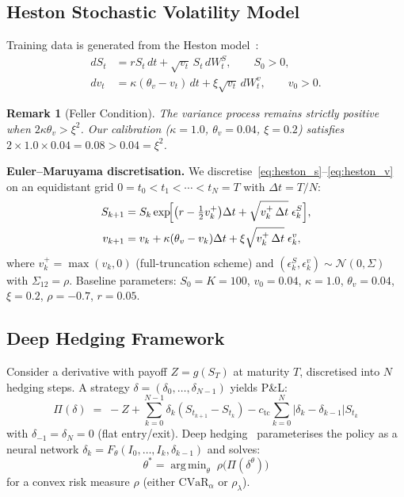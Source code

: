 \documentclass[11pt]{article}
\newtheorem{remark}[theorem]{Remark}
\newcommand{\cvar}{\mathrm{CVaR}}
\DeclareMathOperator*{\argmin}{arg\,min}
\begin{document}
\subsection{Heston Stochastic Volatility Model}

Training data is generated from the Heston model~\citep{heston1993closed}:
\begin{align}
    dS_t &= r S_t \, dt + \sqrt{v_t}\, S_t \, dW_t^S, \qquad S_0 > 0, \label{eq:heston_s} \\
    dv_t &= \kappa(\theta_v - v_t) \, dt + \xi \sqrt{v_t} \, dW_t^v, \qquad v_0 > 0. \label{eq:heston_v}
\end{align}

\begin{remark}[Feller Condition]
The variance process remains strictly positive when $2\kappa\theta_v > \xi^2$.  Our calibration ($\kappa=1.0$, $\theta_v=0.04$, $\xi=0.2$) satisfies $2\times 1.0\times 0.04 = 0.08 > 0.04 = \xi^2$.
\end{remark}

\textbf{Euler--Maruyama discretisation.}  We discretise~\eqref{eq:heston_s}--\eqref{eq:heston_v} on an equidistant grid $0=t_0<t_1<\cdots<t_N=T$ with $\Delta t = T/N$:
\begin{align}
    S_{k+1} &= S_k \exp\!\Bigl[\bigl(r - \tfrac{1}{2}v_k^+\bigr)\Delta t + \sqrt{v_k^+\,\Delta t}\;\epsilon_k^S\Bigr], \label{eq:euler_s}\\
    v_{k+1} &= v_k + \kappa(\theta_v - v_k)\Delta t + \xi\sqrt{v_k^+\,\Delta t}\;\epsilon_k^v, \label{eq:euler_v}
\end{align}
where $v_k^+ = \max(v_k,0)$ (full-truncation scheme) and $(\epsilon_k^S, \epsilon_k^v) \sim \mathcal{N}(0, \Sigma)$ with $\Sigma_{12}=\rho$.
Baseline parameters: $S_0 = K = 100$, $v_0 = 0.04$, $\kappa = 1.0$, $\theta_v = 0.04$, $\xi = 0.2$, $\rho = -0.7$, $r=0.05$.

\subsection{Deep Hedging Framework}

Consider a derivative with payoff $Z = g(S_T)$ at maturity $T$, discretised into $N$ hedging steps. A strategy $\delta = (\delta_0, \ldots, \delta_{N-1})$ yields P\&L:
\begin{equation}
    \Pi(\delta) \;=\; -Z + \sum_{k=0}^{N-1} \delta_k (S_{t_{k+1}} - S_{t_k}) - c_{\mathrm{tc}}\sum_{k=0}^{N} |\delta_k - \delta_{k-1}| S_{t_k}
    \label{eq:pnl}
\end{equation}
with $\delta_{-1}=\delta_N=0$ (flat entry/exit).  Deep hedging~\citep{buehler2019deep} parameterises the policy as a neural network $\delta_k = F_\theta(I_0, \ldots, I_k, \delta_{k-1})$ and solves:
\begin{equation}
    \theta^* = \argmin_\theta \;\rho\!\bigl(\Pi(\delta^\theta)\bigr)
    \label{eq:dh_opt}
\end{equation}
for a convex risk measure $\rho$ (either $\cvar_\alpha$ or $\rho_\lambda$).
\end{document}
